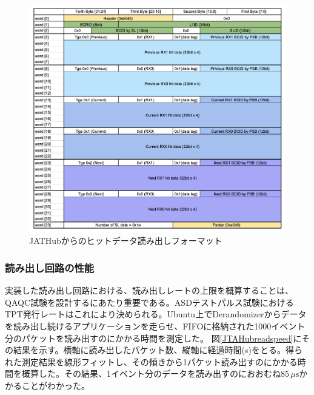 \begin{figure} 
\centering
\includegraphics[width=16cm]{fig/QAQC/JATHubhitformat.png}
\caption[JATHubからのヒットデータ読み出しフォーマット]{JATHubからのヒットデータ読み出しフォーマット}
\label{JATHubhitformat}
\end{figure}

\subsubsection{読み出し回路の性能} \par
実装した読み出し回路における、読み出しレートの上限を概算することは、QAQC試験を設計するにあたり重要である。ASDテストパルス試験におけるTPT発行レートはこれにより決められる。Ubuntu上でDerandomizerからデータを読み出し続けるアプリケーションを走らせ、FIFOに格納された1000イベント分のパケットを読み出すのにかかる時間を測定した。
図\ref{JTAHubreadspeed}にその結果を示す。横軸に読み出したパケット数、縦軸に経過時間(s)をとる。得られた測定結果を線形フィットし、その傾きから1パケット読み出すのにかかる時間を概算した。その結果、1イベント分のデータを読み出すのにおおむね$85\,\mu\mathrm{s}$かかることがわかった。

